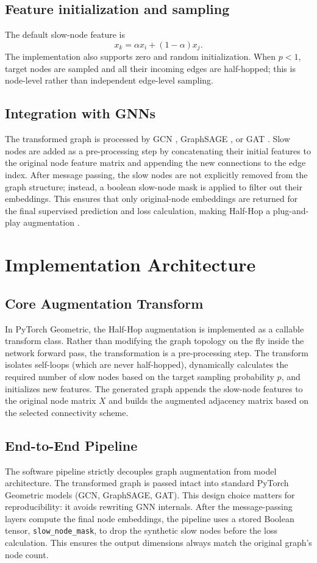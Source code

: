 \documentclass[conference]{IEEEtran}
\begin{document}
\subsection{Feature initialization and sampling}
The default slow-node feature is
\begin{equation}
x_k=\alpha x_i+(1-\alpha)x_j.
\end{equation}
The implementation also supports zero and random initialization. When $p<1$, target nodes are sampled and all their incoming edges are half-hopped; this is node-level rather than independent edge-level sampling.

\subsection{Integration with GNNs}
The transformed graph is processed by GCN \cite{kipf}, GraphSAGE \cite{hamilton}, or GAT \cite{gat}. Slow nodes are added as a pre-processing step by concatenating their initial features to the original node feature matrix and appending the new connections to the edge index. After message passing, the slow nodes are not explicitly removed from the graph structure; instead, a boolean slow-node mask is applied to filter out their embeddings. This ensures that only original-node embeddings are returned for the final supervised prediction and loss calculation, making Half-Hop a plug-and-play augmentation \cite{azabou}.

\section{Implementation Architecture}
\subsection{Core Augmentation Transform}
In PyTorch Geometric, the Half-Hop augmentation is implemented as a callable transform class. Rather than modifying the graph topology on the fly inside the network forward pass, the transformation is a pre-processing step. The transform isolates self-loops (which are never half-hopped), dynamically calculates the required number of slow nodes based on the target sampling probability $p$, and initializes new features. The generated graph appends the slow-node features to the original node matrix $X$ and builds the augmented adjacency matrix based on the selected connectivity scheme.

\subsection{End-to-End Pipeline}
The software pipeline strictly decouples graph augmentation from model architecture. The transformed graph is passed intact into standard PyTorch Geometric models (GCN, GraphSAGE, GAT). This design choice matters for reproducibility: it avoids rewriting GNN internals. After the message-passing layers compute the final node embeddings, the pipeline uses a stored Boolean tensor, \texttt{slow\_node\_mask}, to drop the synthetic slow nodes before the loss calculation. This ensures the output dimensions always match the original graph's node count.
\end{document}
